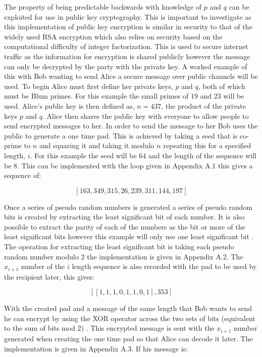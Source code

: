 \documentclass{article}
\begin{document}
The property of being predictable backwards with knowledge of $p$ and $q$ can be exploited for use in public key cryptography. This is important to investigate as this implementation of public key encryption is similar in security to that of the widely used RSA encryption which also relies on security based on the computational difficulty of integer factorization. This is used to secure internet traffic as the information for encryption is shared publicly however the message can only be decrypted by the party with the private key. A worked example of this with Bob wanting to send Alice a secure message over public channels will be used. To begin Alice must first define her private keys, $p$ and $q$, both of which must be Blum primes. For this example the small primes of $19$ and $23$ will be used. Alice's public key is then defined as, $n=437$, the product of the private keys $p$ and $q$. Alice then shares the public key with everyone to allow people to send encrypted messages to her. In order to send the message to her Bob uses the public to generate a one time pad. This is achieved by taking a seed that is co-prime to $n$ and squaring it and taking it modulo $n$ repeating this for a specified length, $i$. For this example the seed will be $64$ and the length of the sequence will be $8$. This can be implemented with the loop given in Appendix A.1 this gives a sequence of:


$$[163, 349, 315, 26, 239, 311, 144, 197]$$

Once a series of pseudo random numbers is generated a series of pseudo random bits is created by extracting the least significant bit of each number. It is also possible to extract the parity of each of the numbers as the bit or more of the least significant bits however this example will only use one least significant bit \cite{Blum1986}. The operation for extracting the least significant bit is taking each pseudo random number modulo $2$ the implementation is given in Appendix A.2. The $x_{i+1}$ number of the $i$ length sequence is also recorded with the pad to be used by the recipient later, this gives:

$$[[1, 1, 1, 0, 1, 1, 0, 1], 353]$$

With the created pad and a message of the same length that Bob wants to send he can encrypt by using the XOR operator across the two sets of bits (equivalent to the sum of bits mod 2) \cite{Blum1986}. This encrypted message is sent with the $x_{i+1}$ number generated when creating the one time pad so that Alice can decode it later. The implementation is given in Appendix A.3. If his message is:
\end{document}
